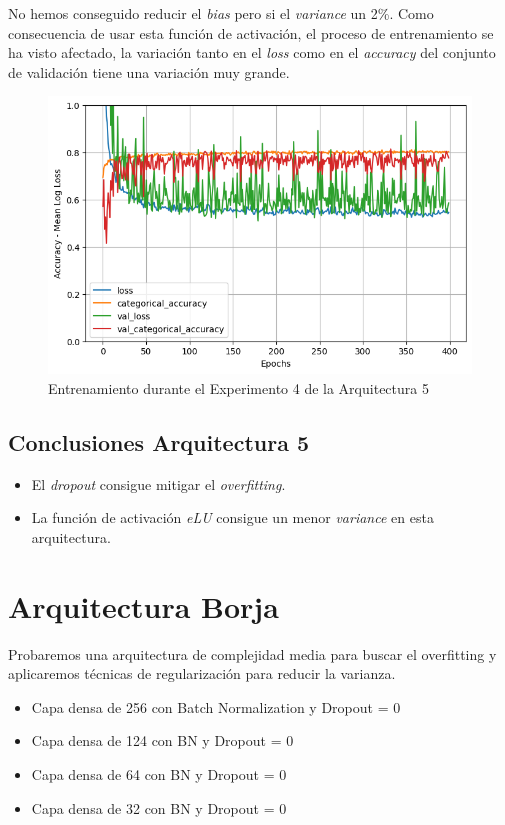 \documentclass{article}
\begin{document}
		    No hemos conseguido reducir el \textit{bias} pero si el \textit{variance} un 2\%. Como consecuencia de usar esta funci\'on de activaci\'on, el proceso de entrenamiento se ha visto afectado, la variaci\'on tanto en el \textit{loss} como en el \textit{accuracy} del conjunto de validaci\'on tiene una variaci\'on muy grande.
			\begin{figure}[!h]
				\begin{center}
					\includegraphics[scale=0.5]{d-tr-a5-e4.png}		
					\caption{Entrenamiento durante el Experimento 4 de la Arquitectura 5}	
					\label{d-tr-a5-e4}
				\end{center}
			\end{figure}
		
		
		\subsection{Conclusiones Arquitectura 5}
		\label{d-cl-a5}
			\begin{itemize}
				\item El \textit{dropout} consigue mitigar el \textit{overfitting}.
				\item La funci\'on de activaci\'on \textit{eLU} consigue un menor \textit{variance} en esta arquitectura.
			\end{itemize}
		
    
    \section{Arquitectura Borja}
			Probaremos una arquitectura de complejidad media para buscar el overfitting y aplicaremos t\'ecnicas de regularizaci\'on para reducir la varianza. 
			\begin{itemize}
			    \item Capa densa de 256 con Batch Normalization y Dropout = 0
                \item Capa densa de 124 con BN y Dropout = 0
                \item Capa densa de 64 con BN y Dropout = 0
                \item Capa densa de 32 con BN y Dropout = 0
			\end{itemize}
\end{document}
